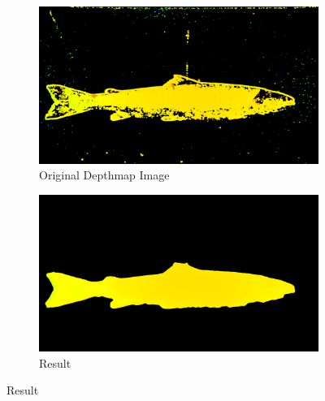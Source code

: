 \begin{figure}[H]
    \medskip
    \begin{subfigure}{0.49\textwidth}
        \includegraphics[width=\linewidth]{images/results/algorithm_test/original_73}
        \caption{Original Depthmap Image} 
        \label{fig:original_depthmap_73}
    \end{subfigure}\hspace*{\fill}
    \begin{subfigure}{0.49\textwidth}
        \includegraphics[width=\linewidth]{images/results/algorithm_test/median_filter_63}
        \caption{Result} 
        \label{fig:result_73}
    \end{subfigure}
    

\end{figure}
